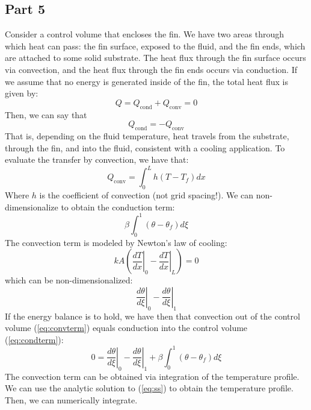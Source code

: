\documentclass[10pt,letterpaper,notitlepage]{article}
\begin{document}
    \subsection{Part 5}
    Consider a control volume that encloses the fin. We have two areas through which heat can pass: the fin surface, exposed to the fluid, and the fin ends, which are attached to some solid substrate. The heat flux through the fin surface occurs via convection, and the heat flux through the fin ends occurs via conduction. If we assume that no energy is generated inside of the fin, the total heat flux is given by:
    \begin{equation*}
        Q = Q_{\text{cond}} + Q_{\text{conv}} = 0
    \end{equation*}
    Then, we can say that 
    \begin{equation*}
        Q_{\text{cond}} = -Q_{\text{conv}}
    \end{equation*}
    That is, depending on the fluid temperature, heat travels from the substrate, through the fin, and into the fluid, consistent with a cooling application. To evaluate the transfer by convection, we have that:
    \begin{equation}
        Q_{\text{conv}} = \int_{0}^{L} h (T-T_f) dx
    \end{equation}
    Where $h$ is the coefficient of convection (not grid spacing!). We can non-dimensionalize to obtain the conduction term:
    \begin{equation}
        \beta \int_{0}^{1}(\theta - \theta_f) d\xi
        \label{eq:convterm}
    \end{equation}
    The convection term is modeled by Newton's law of cooling:
    \begin{equation*}
        k A (\left. \frac{dT}{dx} \right|_{0} - \left. \frac{dT}{dx} \right|_{L}) = 0
    \end{equation*}
    which can be non-dimensionalized:
    \begin{equation}
        \left. \frac{d\theta}{d\xi} \right|_{0} - \left. \frac{d\theta}{d\xi} \right|_{1}
        \label{eq:condterm}
    \end{equation}
    If the energy balance is to hold, we have then that convection out of the control volume (\cref{eq:convterm}) equals conduction into the control volume (\cref{eq:condterm}):
    \begin{equation}
        0 = \left. \frac{d\theta}{d\xi} \right|_{0} - \left. \frac{d\theta}{d\xi} \right|_{1} + \beta \int_{0}^{1}(\theta - \theta_f) d\xi
    \end{equation}
    The convection term can be obtained via integration of the temperature profile. We can use the analytic solution to (\cref{eq:ss}) to obtain the temperature profile. Then, we can numerically integrate.
\end{document}
